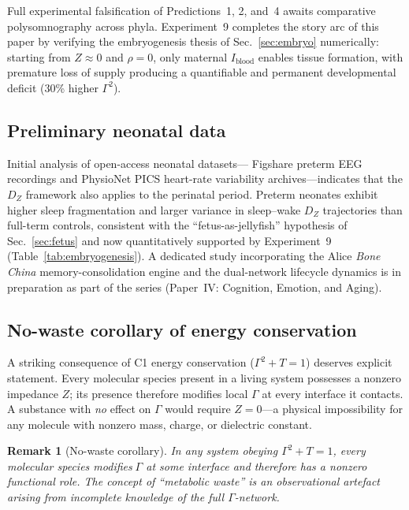 ﻿\documentclass[aps,pre,twocolumn,superscriptaddress,floatfix]{revtex4-2}
\newtheorem{remark}{Remark}
\begin{document}
Full experimental falsification of Predictions~1, 2, and~4
awaits comparative polysomnography across phyla.
Experiment~9 completes the story arc of this paper by
verifying the embryogenesis thesis of Sec.~\ref{sec:embryo}
numerically: starting from $Z \approx 0$ and $\rho = 0$,
only maternal $I_{\mathrm{blood}}$ enables tissue formation,
with premature loss of supply producing a quantifiable
and permanent developmental deficit (30\% higher $\Gamma^2$).

\subsection{Preliminary neonatal data}

Initial analysis of open-access neonatal datasets---
Figshare preterm EEG recordings and PhysioNet PICS
heart-rate variability archives---indicates that the
$D_Z$ framework also applies to the perinatal period.
Preterm neonates exhibit higher sleep fragmentation and
larger variance in sleep--wake $D_Z$ trajectories
than full-term controls, consistent with the
``fetus-as-jellyfish'' hypothesis of Sec.~\ref{sec:fetus}
and now quantitatively supported by Experiment~9
(Table~\ref{tab:embryogenesis}).
A dedicated study incorporating the Alice
\emph{Bone China} memory-consolidation engine and the
dual-network lifecycle dynamics is
in preparation as part of the series
(Paper~IV: Cognition, Emotion, and Aging).

\subsection{No-waste corollary of energy conservation}
\label{sec:no-waste}

A striking consequence of C1 energy conservation
($\Gamma^2 + T = 1$) deserves explicit statement.
Every molecular species present in a living system
possesses a nonzero impedance $Z$; its presence therefore
modifies local $\Gamma$ at every interface it contacts.
A substance with \emph{no} effect on $\Gamma$ would
require $Z = 0$---a physical impossibility for any
molecule with nonzero mass, charge, or dielectric constant.

\begin{remark}[No-waste corollary]
\label{rem:no-waste}
In any system obeying $\Gamma^2 + T = 1$,
every molecular species modifies$\;\Gamma$
at some interface and therefore has a nonzero
functional role.  The concept of ``metabolic waste''
is an observational artefact arising from incomplete
knowledge of the full $\Gamma$-network.
\end{remark}
\end{document}
